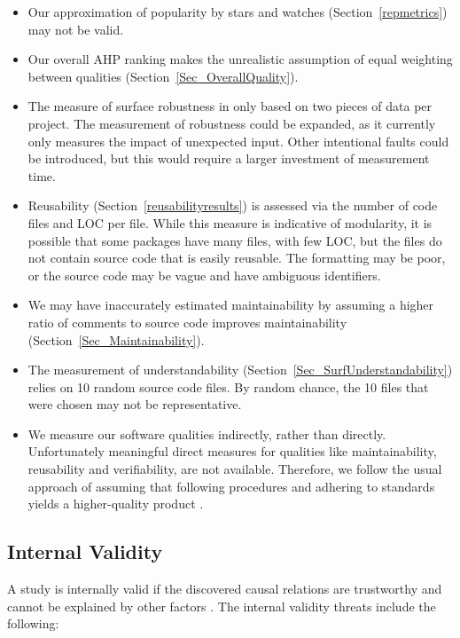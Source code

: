 \documentclass[final, 3p, times, authoryear]{elsarticle}
\begin{document}
\begin{itemize}
\item Our approximation of popularity by stars and watches
(Section~\ref{repmetrics}) may not be valid. 
\item Our overall AHP ranking makes the unrealistic assumption of equal
weighting between qualities (Section~\ref{Sec_OverallQuality}).
\item The measure of surface robustness in only based on two pieces of data per
project. The measurement of robustness could be expanded, as it currently only
measures the impact of unexpected input. Other intentional faults could be
introduced, but this would require a larger investment of measurement time. 
\item Reusability (Section~\ref{reusabilityresults}) is assessed via the number
of code files and LOC per file. While this measure is indicative of modularity,
it is possible that some packages have many files, with few LOC, but the files
do not contain source code that is easily reusable. The formatting may be poor,
or the source code may be vague and have ambiguous identifiers. 
\item We may have inaccurately estimated maintainability by assuming a higher
ratio of comments to source code improves maintainability
(Section~\ref{Sec_Maintainability}). 
\item The measurement of understandability
(Section~\ref{Sec_SurfUnderstandability}) relies on 10 random source code files.
By random chance, the 10 files that were chosen may not be representative. 
\item We measure our software qualities indirectly, rather than directly.
Unfortunately meaningful direct measures for qualities like maintainability,
reusability and verifiability, are not available.  Therefore, we follow the
usual approach of assuming that following procedures and adhering to standards
yields a higher-quality product \citep[p.\ 112]{VanVliet2000}.
\end{itemize}

\subsection{Internal Validity} \label{Sec_InternalValidity}

A study is internally valid if the discovered causal relations are trustworthy
and cannot be explained by other factors \citep{AmpatzoglouEtAl2019}. The
internal validity threats include the following:
\end{document}
